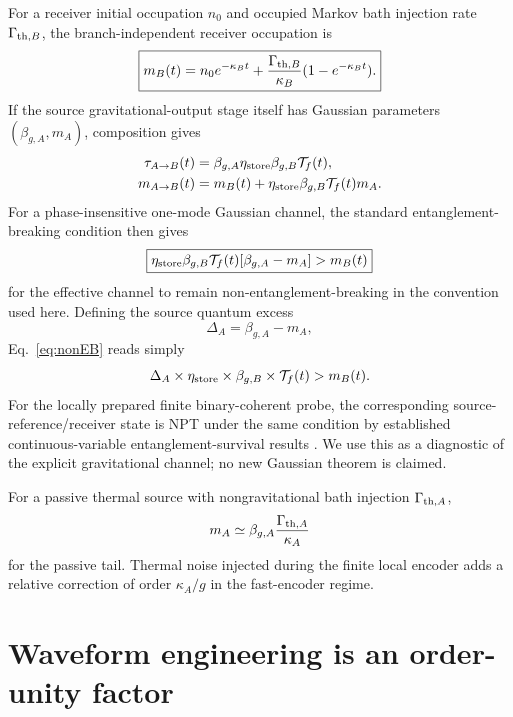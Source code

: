 \documentclass[11pt]{article}
\begin{document}
For a receiver initial occupation $n_0$ and occupied Markov bath injection rate $\Gamma_{{\rm th},B}$, the branch-independent receiver occupation is
\begin{equation}
\boxed{
m_B(t)
=n_0e^{-\kappa_Bt}
+\frac{\Gamma_{{\rm th},B}}{\kappa_B}
(1-e^{-\kappa_Bt}).
}
\label{eq:mB}
\end{equation}
If the source gravitational-output stage itself has Gaussian parameters $(\beta_{g,A},m_A)$, composition gives
\begin{align}
\tau_{A\to B}(t)
&=\beta_{g,A}\eta_{\rm store}\beta_{g,B}\mathcal T_f(t),\\
m_{A\to B}(t)
&=m_B(t)
+\eta_{\rm store}\beta_{g,B}\mathcal T_f(t)m_A.
\end{align}
For a phase-insensitive one-mode Gaussian channel, the standard entanglement-breaking condition then gives \cite{Holevo2008EB}
\begin{equation}
\boxed{
\eta_{\rm store}\beta_{g,B}\mathcal T_f(t)
[\beta_{g,A}-m_A]
>m_B(t)
}
\label{eq:nonEB}
\end{equation}
for the effective channel to remain non-entanglement-breaking in the convention used here. Defining the source quantum excess
\begin{equation}
\Delta_A=\beta_{g,A}-m_A,
\end{equation}
Eq.~\eqref{eq:nonEB} reads simply
\begin{equation}
\Delta_A\times\eta_{\rm store}\times\beta_{g,B}\times\mathcal T_f(t)
>m_B(t).
\end{equation}
For the locally prepared finite binary-coherent probe, the corresponding source-reference/receiver state is NPT under the same condition by established continuous-variable entanglement-survival results \cite{FilippovZiman2014}. We use this as a diagnostic of the explicit gravitational channel; no new Gaussian theorem is claimed.

For a passive thermal source with nongravitational bath injection $\Gamma_{{\rm th},A}$,
\begin{equation}
m_A\simeq
\beta_{g,A}\frac{\Gamma_{{\rm th},A}}{\kappa_A}
\end{equation}
for the passive tail. Thermal noise injected during the finite local encoder adds a relative correction of order $\kappa_A/g$ in the fast-encoder regime.

\section{Waveform engineering is an order-unity factor}
\label{sec:waveforms}
\end{document}
